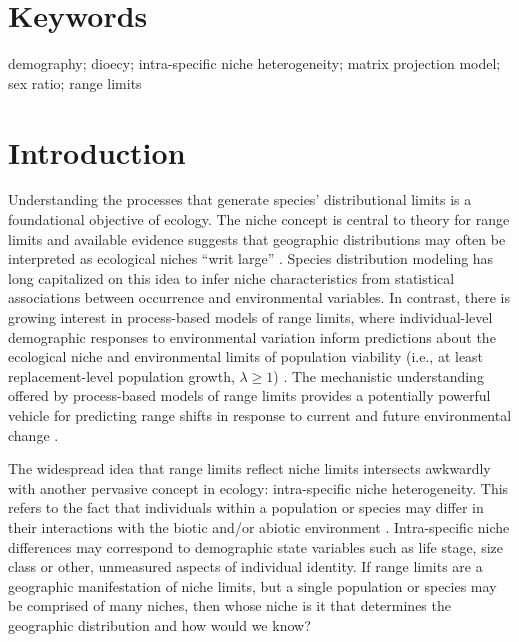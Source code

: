 \documentclass[11pt]{article}\usepackage[]{graphicx}\usepackage[]{color}
\begin{document}
\section*{Keywords}
demography; dioecy; intra-specific niche heterogeneity; matrix projection model; sex ratio; range limits

\newpage
\section*{Introduction}

Understanding the processes that generate species' distributional limits is a foundational objective of ecology.
The niche concept is central to theory for range limits \citep{Hutchinson1958} and available evidence suggests that geographic distributions may often be interpreted as ecological niches ``writ large'' \citep{lee2016synthesis,hargreaves2013species}. 
Species distribution modeling has long capitalized on this idea to infer niche characteristics from statistical associations between occurrence and environmental variables.
In contrast, there is growing interest in process-based models of range limits, where individual-level demographic responses to environmental variation inform predictions about the ecological niche and environmental limits of population viability (i.e., at least replacement-level population growth, $\lambda \geq 1$) \citep{merow2014using,merow2017climate,diez2014probabilistic}. 
The mechanistic understanding offered by process-based models of range limits provides a potentially powerful vehicle for predicting range shifts in response to current and future environmental change \citep{evans2016towards,ehrlen2015predicting}. 

The widespread idea that range limits reflect niche limits intersects awkwardly with another pervasive concept in ecology: intra-specific niche heterogeneity. 
This refers to the fact that individuals within a population or species may differ in their interactions with the biotic and/or abiotic environment \citep{bolnick2002ecology,araujo2011ecological,holt2009bringing}. 
Intra-specific niche differences may correspond to demographic state variables such as life stage, size class or other, unmeasured aspects of individual identity. 
If range limits are a geographic manifestation of niche limits, but a single population or species may be comprised of many niches, then whose niche is it that determines the geographic distribution and how would we know?
\end{document}
